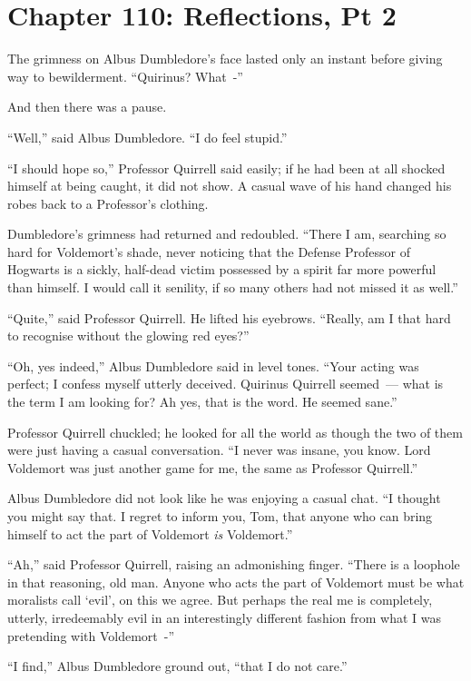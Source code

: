 \chapter{Chapter 110: Reflections, Pt 2}
The grimness on Albus Dumbledore's face lasted only an instant before giving way to bewilderment. ``Quirinus? What~-''

And then there was a pause.

``Well,'' said Albus Dumbledore. ``I do feel stupid.''

``I should hope so,'' Professor Quirrell said easily; if he had been at all shocked himself at being caught, it did not show. A casual wave of his hand changed his robes back to a Professor's clothing.

Dumbledore's grimness had returned and redoubled. ``There I am, searching so hard for Voldemort's shade, never noticing that the Defense Professor of Hogwarts is a sickly, half-dead victim possessed by a spirit far more powerful than himself. I would call it senility, if so many others had not missed it as well.''

``Quite,'' said Professor Quirrell. He lifted his eyebrows. ``Really, am I that hard to recognise without the glowing red eyes?''

``Oh, yes indeed,'' Albus Dumbledore said in level tones. ``Your acting was perfect; I confess myself utterly deceived. Quirinus Quirrell seemed~--- what is the term I am looking for? Ah yes, that is the word. He seemed sane.''

Professor Quirrell chuckled; he looked for all the world as though the two of them were just having a casual conversation. ``I never was insane, you know. Lord Voldemort was just another game for me, the same as Professor Quirrell.''

Albus Dumbledore did not look like he was enjoying a casual chat. ``I thought you might say that. I regret to inform you, Tom, that anyone who can bring himself to act the part of Voldemort \emph{is} Voldemort.''

``Ah,'' said Professor Quirrell, raising an admonishing finger. ``There is a loophole in that reasoning, old man. Anyone who acts the part of Voldemort must be what moralists call `evil', on this we agree. But perhaps the real me is completely, utterly, irredeemably evil in an interestingly different fashion from what I was pretending with Voldemort~-''

``I find,'' Albus Dumbledore ground out, ``that I do not care.''

